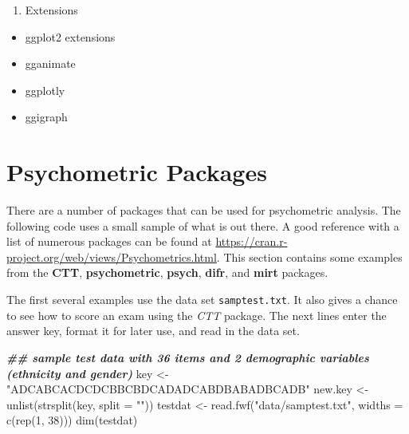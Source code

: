 \documentclass[
]{book}
\newenvironment{Shaded}{\begin{snugshade}}{\end{snugshade}}
\newcommand{\AttributeTok}[1]{\textcolor[rgb]{0.77,0.63,0.00}{#1}}
\newcommand{\DecValTok}[1]{\textcolor[rgb]{0.00,0.00,0.81}{#1}}
\newcommand{\DocumentationTok}[1]{\textcolor[rgb]{0.56,0.35,0.01}{\textbf{\textit{#1}}}}
\newcommand{\FunctionTok}[1]{\textcolor[rgb]{0.00,0.00,0.00}{#1}}
\newcommand{\NormalTok}[1]{#1}
\newcommand{\OtherTok}[1]{\textcolor[rgb]{0.56,0.35,0.01}{#1}}
\newcommand{\StringTok}[1]{\textcolor[rgb]{0.31,0.60,0.02}{#1}}
\providecommand{\tightlist}{%
  \setlength{\itemsep}{0pt}\setlength{\parskip}{0pt}}
\begin{document}
\begin{enumerate}
\def\labelenumi{\arabic{enumi}.}
\setcounter{enumi}{3}
\tightlist
\item
  Extensions
\end{enumerate}

\begin{itemize}
\tightlist
\item
  ggplot2 extensions
\item
  gganimate
\item
  ggplotly
\item
  ggigraph
\end{itemize}

\hypertarget{psychometric-packages}{%
\chapter{Psychometric Packages}\label{psychometric-packages}}

There are a number of packages that can be used for psychometric analysis. The following code uses a small sample of what is out there. A good reference with a list of numerous packages can be found at \url{https://cran.r-project.org/web/views/Psychometrics.html}. This section contains some examples from the \textbf{CTT}, \textbf{psychometric}, \textbf{psych}, \textbf{difr}, and \textbf{mirt} packages.

The first several examples use the data set \texttt{samptest.txt}. It also gives a chance to see how to score an exam using the \emph{CTT} package. The next lines enter the answer key, format it for later use, and read in the data set.

\begin{Shaded}
\begin{Highlighting}[]
\DocumentationTok{\#\# sample test data with 36 items and 2 demographic variables (ethnicity and gender)}
\NormalTok{key }\OtherTok{\textless{}{-}} \StringTok{"ADCABCACDCDCBBCBDCADADCABDBABADBCADB"}
\NormalTok{new.key }\OtherTok{\textless{}{-}} \FunctionTok{unlist}\NormalTok{(}\FunctionTok{strsplit}\NormalTok{(key, }\AttributeTok{split =} \StringTok{""}\NormalTok{))}
\NormalTok{testdat }\OtherTok{\textless{}{-}} \FunctionTok{read.fwf}\NormalTok{(}\StringTok{"data/samptest.txt"}\NormalTok{, }\AttributeTok{widths =} \FunctionTok{c}\NormalTok{(}\FunctionTok{rep}\NormalTok{(}\DecValTok{1}\NormalTok{, }\DecValTok{38}\NormalTok{)))}
\FunctionTok{dim}\NormalTok{(testdat)}
\end{Highlighting}
\end{Shaded}
\end{document}
